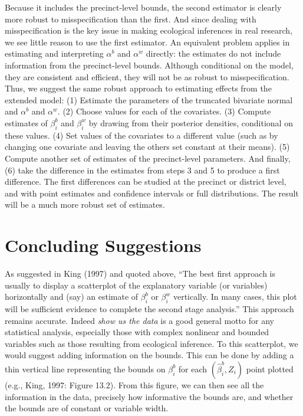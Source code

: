 \documentclass[11pt,titlepage]{article}
\begin{document}
Because it includes the precinct-level bounds, the second estimator is
clearly more robust to misspecification than the first.  And since
dealing with misspecification is the key issue in making ecological
inferences in real research, we see little reason to use the first
estimator.  An equivalent problem applies in estimating and
interpreting $\alpha^b$ and $\alpha^w$ directly: the estimates do not
include information from the precinct-level bounds.  Although
conditional on the model, they are consistent and efficient, they will
not be as robust to misspecification.  Thus, we suggest the same
robust approach to estimating effects from the extended model: (1)
Estimate the parameters of the truncated bivariate normal and
$\alpha^b$ and $\alpha^w$.  (2) Choose values for each of the
covariates. (3) Compute estimates of $\beta_i^b$ and $\beta_i^w$ by
drawing from their posterior densities, conditional on these values.
(4) Set values of the covariates to a different value (such as by
changing one covariate and leaving the others set constant at their
means). (5) Compute another set of estimates of the precinct-level
parameters.  And finally, (6) take the difference in the estimates
from steps 3 and 5 to produce a first difference.  The first
differences can be studied at the precinct or district level, and with
point estimates and confidence intervals or full distributions.  The
result will be a much more robust set of estimates.

\section{Concluding Suggestions}

As suggested in King (1997) and quoted above, ``The best first
approach is usually to display a scatterplot of the explanatory
variable (or variables) horizontally and (say) an estimate of
$\beta_i^b$ or $\beta_i^w$ vertically.  In many cases, this plot will
be sufficient evidence to complete the second stage analysis.''  This
approach remains accurate.  Indeed \emph{show us the data} is a good
general motto for any statistical analysis, especially those with
complex nonlinear and bounded variables such as those resulting from
ecological inference.  To this scatterplot, we would suggest adding
information on the bounds.  This can be done by adding a thin vertical
line representing the bounds on $\beta_i^b$ for each
$(\hat\beta_i^b,Z_i)$ point plotted (e.g., King, 1997: Figure 13.2).
From this figure, we can then see all the information in the data,
precisely how informative the bounds are, and whether the bounds are
of constant or variable width.
\end{document}
